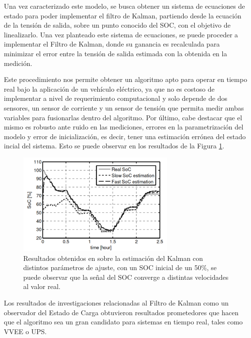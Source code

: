 \documentclass[10pt,a4paper]{article}
\begin{document}
\noindent Una vez caracterizado este modelo, se busca obtener un sistema de 
ecuaciones de estado para poder implementar el filtro de Kalman, partiendo desde 
la ecuaci\'on de la tensi\'on de salida, sobre un punto conocido del 
\acrshort{SOC}, con el objetivo de linealizarlo. Una vez planteado este sistema 
de ecuaciones, se puede proceder a implementar el Filtro de Kalman, donde su 
ganancia es recalculada para minimizar el error entre la tensi\'on de salida 
estimada con la obtenida en la medici\'on. 

\noindent Este procedimiento nos permite obtener un algoritmo apto para operar
en tiempo real bajo la aplicaci\'on de un veh\'iculo el\'ectrico, ya que no es
costoso de implementar a nivel de requerimiento computacional y solo depende de
dos sensores, un sensor de corriente y un sensor de tensi\'on que permita medir
ambas variables para fusionarlas dentro del algoritmo. Por \'ultimo, cabe
destacar que el mismo es robusto ante ruido en las mediciones, errores en la
parametrizaci\'on del modelo y error de inicializaci\'on, es decir, tener una
estimaci\'on err\'onea del estado incial del sistema. Esto se puede observar en
los resultados de la Figura \ref{resultados_soc_spagnoli}.

\begin{figure}[h!]
    \begin{center}
        \includegraphics[width=0.7\textwidth]{soc_results_spagnoli.png}
        \caption{Resultados obtenidos en \cite{spagnol_kalman} sobre la
        estimaci\'on del Kalman con distintos par\'ametros de ajuste, con un
        \acrshort{SOC} inicial de un 50\%, se puede observar que la señal del
        \acrshort{SOC} converge a distintas velocidades al valor real.}
        \label{resultados_soc_spagnoli}
    \end{center}
\end{figure}

\noindent Los resultados de investigaciones relacionadas al Filtro de Kalman
como un observador del Estado de Carga obtuvieron resultados prometedores que
hacen que el algoritmo sea un gran candidato para sistemas en tiempo real, tales
como \acrshort{VVEE} o \acrshort{UPS}.
\end{document}
